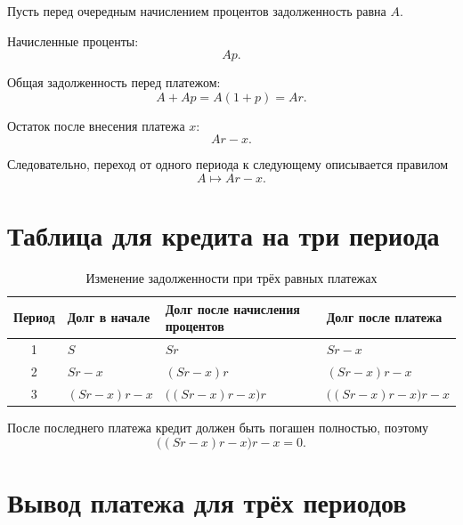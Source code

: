 \documentclass[a4paper,12pt]{article}
\begin{document}
Пусть перед очередным начислением процентов задолженность равна \(A\).

\begin{checklist}
  \item Начисленные проценты:
  \[
  Ap.
  \]

  \item Общая задолженность перед платежом:
  \[
  A+Ap=A(1+p)=Ar.
  \]

  \item Остаток после внесения платежа \(x\):
  \[
  Ar-x.
  \]
\end{checklist}

Следовательно, переход от одного периода к следующему описывается правилом
\[
\boxed{A\longmapsto Ar-x}.
\]

\section{Таблица для кредита на три периода}

\begin{table}[ht]
  \centering
  \caption{Изменение задолженности при трёх равных платежах}
  \renewcommand{\arraystretch}{1.55}
  \small
  \begin{tabularx}{\linewidth}{
    @{}
    c
    >{\raggedright\arraybackslash}X
    >{\raggedright\arraybackslash}X
    >{\raggedright\arraybackslash}X
    @{}
  }
    \toprule
    \textbf{Период} &
    \textbf{Долг в начале} &
    \textbf{Долг после начисления процентов} &
    \textbf{Долг после платежа} \\
    \midrule

    1 &
    \(S\) &
    \(Sr\) &
    \(Sr-x\) \\

    2 &
    \(Sr-x\) &
    \((Sr-x)r\) &
    \((Sr-x)r-x\) \\

    3 &
    \((Sr-x)r-x\) &
    \(\bigl((Sr-x)r-x\bigr)r\) &
    \(\bigl((Sr-x)r-x\bigr)r-x\) \\
    \bottomrule
  \end{tabularx}
\end{table}

После последнего платежа кредит должен быть погашен полностью, поэтому
\[
\boxed{\bigl((Sr-x)r-x\bigr)r-x=0}.
\]

\section{Вывод платежа для трёх периодов}
\end{document}
